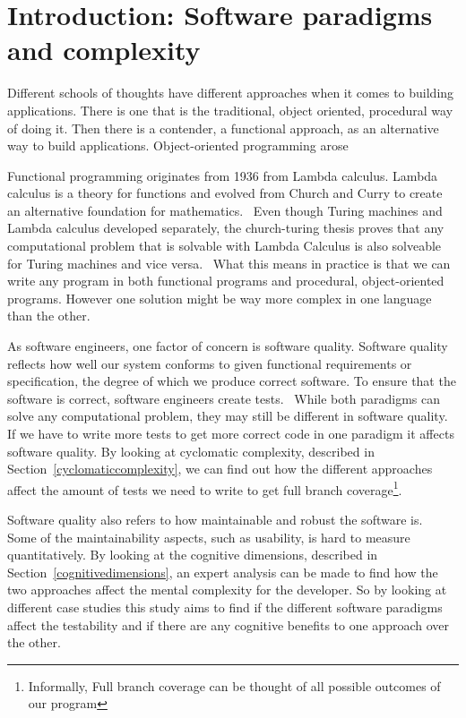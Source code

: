\chapter{Introduction: Software paradigms and complexity}

Different schools of thoughts have different approaches when it comes to
building applications. There is one that is the traditional, object oriented,
procedural way of doing it. Then there is a contender, a functional approach, as
an alternative way to build applications. Object-oriented programming arose 



Functional programming originates from 1936 from Lambda calculus. Lambda
calculus is a theory for functions and evolved from Church and Curry to create
an alternative foundation for mathematics.~\cite{Turner} Even though Turing
machines and Lambda calculus developed separately, the church-turing thesis
proves that any computational problem that is solvable with Lambda Calculus
is also solveable for Turing machines and vice versa.~\cite{sep-church-turing}
What this means in practice is that we can write any program in both functional
programs and procedural, object-oriented programs. However one solution might be
way more complex in one language than the other. 

As software engineers, one factor of concern is software quality. Software
quality reflects how well our system conforms to given functional requirements
or specification, the degree of which we produce correct software. To ensure
that the software is correct, software engineers create
tests.~\cite{Pressman:2004:SEP:994110} While both paradigms can solve any
computational problem, they may still be different in software quality. If we
have to write more tests to get more correct code in one paradigm it affects
software quality. By looking at cyclomatic complexity, described in
Section~\ref{cyclomaticcomplexity}, we can find out how the different approaches
affect the amount of tests we need to write to get full branch
coverage\footnote{Informally, Full branch coverage can be thought of all
possible outcomes of our program}. 

Software quality also refers to how maintainable and robust the software
is.~\cite{Pressman:2004:SEP:994110} Some of the maintainability aspects, such as
usability, is hard to measure quantitatively. By looking at the cognitive
dimensions, described in Section~\ref{cognitivedimensions}, an expert analysis
can be made to find how the two approaches affect the mental complexity for the
developer. So by looking at different case studies this study aims to find if
the different software paradigms affect the testability and if there are any
cognitive benefits to one approach over the other. 

